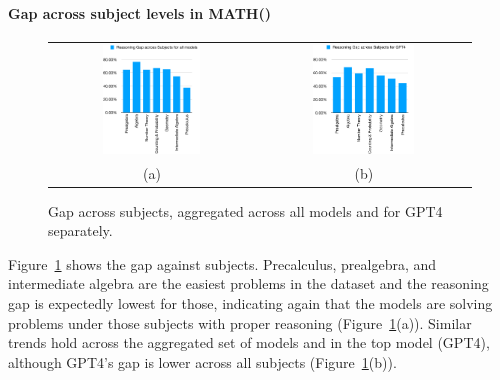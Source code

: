 \documentclass[11pt,a4paper]{article}
\begin{document}
\paragraph{Gap across subject levels in MATH()}
\begin{figure}
  \begin{tabular}{cc}
    \includegraphics[width=0.5\textwidth]{all-subjects} &
    \includegraphics[width=0.5\textwidth]{gpt4-subjects}\\
    (a) & (b)
  \end{tabular}
  \caption{\label{fig:gap-subjects} Gap across subjects, aggregated across all models and for GPT4 separately.}
\end{figure}
Figure~\ref{fig:gap-subjects} shows the gap against subjects. Precalculus, prealgebra, and intermediate algebra
are the easiest problems in the dataset and the reasoning gap is expectedly lowest for those, indicating
again that the models are solving problems under those subjects with proper reasoning (Figure~\ref{fig:gap-subjects}(a)). Similar trends hold across
the aggregated set of models and in the top model (GPT4), although GPT4's gap is lower across all subjects (Figure~\ref{fig:gap-subjects}(b)).
\end{document}
